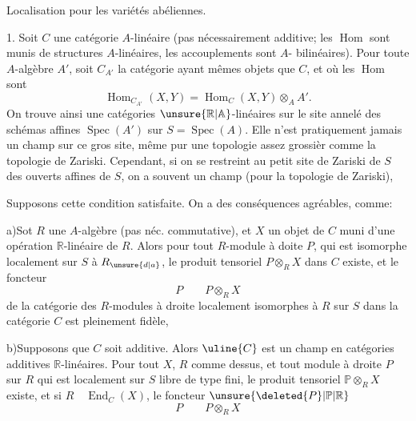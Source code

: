 Localisation pour les variétés abéliennes.

1.\quad {} Soit $C$ une catégorie $A$-linéaire (pas nécessairement additive; les $\operatorname{Hom}$ sont munis de structures $A$-linéaires, les accouplements sont $A$- bilinéaires). Pour toute $A$-algèbre $A'$, soit $C_{A'}$ la catégorie ayant mêmes objets que $C$, et où les $\operatorname{Hom}$ sont
\[
\operatorname{Hom}_{C_{A'}}(X,Y)=\operatorname{Hom}_C(X,Y)\otimes_A A'.
\]
On trouve ainsi une catégories $\unsure{\mathbb{R}|\mathbb{A}}$-linéaires sur le site annelé des schémas affines $\operatorname{Spec}(A')$ sur $S=\operatorname{Spec}(A)$. Elle n'est pratiquement jamais un champ sur ce gros site, même pur une topologie assez grossièr comme la topologie de Zariski. Cependant, si on se restreint au petit site de Zariski  de $S$ des ouverts affines de $S$, on a souvent un champ (pour la topologie de Zariski),  

Supposons cette condition satisfaite. On a des conséquences agréables, comme:

a)\quad Sot  $R$ une $A$-algèbre (pas néc. commutative), et $X$ un objet de $C$ muni d'une opération $\mathbb{R}$-linéaire de $R$. Alors pour tout $R$-module à doite $P$, qui est isomorphe localement sur $S$ à $R_{\unsure{d|a}}$, le produit tensoriel $P\otimes_R X$ dans $C$ existe, et  le foncteur
\[
P\qquad P\otimes_R X
\]
de la catégorie  des $R$-modules à droite localement isomorphes à $R$ sur $S$ dans la catégorie $C$ est pleinement fidèle, 

b)\quad Supposons que $C$ soit additive. Alors $\uline{C}$ est un champ en catégories additives $\mathbb{R}$-linéaires. Pour tout $X$, $R$ comme dessus,  et tout module à droite $P$ sur $R$ qui est localement sur $S$ libre de type fini, le produit tensoriel $\mathbb{P}\otimes_R X$ existe, et si $R\quad\operatorname{End}_C(X)$, le foncteur $\unsure{\deleted{P}|\mathbb{P}|\mathbb{R}}$
\[
P\qquad P\otimes_R X
\]
